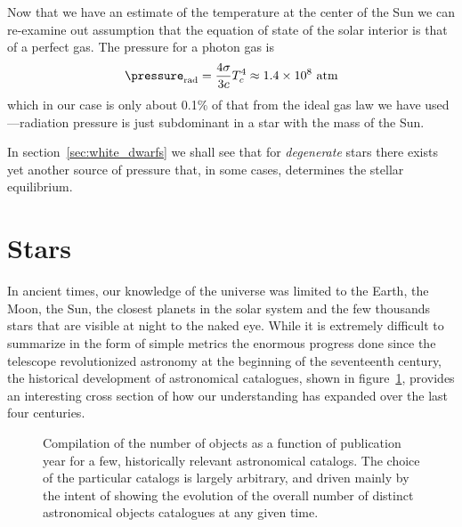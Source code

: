 Now that we have an estimate of the temperature at the center of the Sun we can
re-examine out assumption that the equation of state of the solar interior is that
of a perfect gas. The pressure for a photon gas is
\begin{align*}
	\pressure_\text{rad} = \frac{4\sigma}{3c} T_c^4 \approx 1.4 \times 10^{8}~\text{atm}
\end{align*}
which in our case is only about 0.1\% of that from the ideal gas law we have
used---radiation pressure is just subdominant in a star with the mass of the
Sun.

In section~\ref{sec:white_dwarfs} we shall see that for \emph{degenerate} stars
there exists yet another source of pressure that, in some cases, determines the
stellar equilibrium.



\section{Stars}
\label{sec:stars}

In ancient times, our knowledge of the universe was limited to the Earth, the
Moon, the Sun, the closest planets in the solar system and the few thousands
stars that are visible at night to the naked eye. While it is extremely difficult
to summarize in the form of simple metrics the enormous progress done since the
telescope revolutionized astronomy at the beginning of the seventeenth century,
the historical development of astronomical catalogues, shown in
figure~\ref{fig:astronomical_catalogues}, provides an interesting cross section
of how our understanding has expanded over the last four centuries.

\begin{figure}[htbp!]
	
  \caption{Compilation of the number of objects as a function of publication year
    for a few, historically relevant astronomical catalogs. The choice of the
    particular catalogs is largely arbitrary, and driven mainly by the intent
    of showing the evolution of the overall number of distinct astronomical objects
    catalogues at any given time.}
    \label{fig:astronomical_catalogues}
\end{figure}

